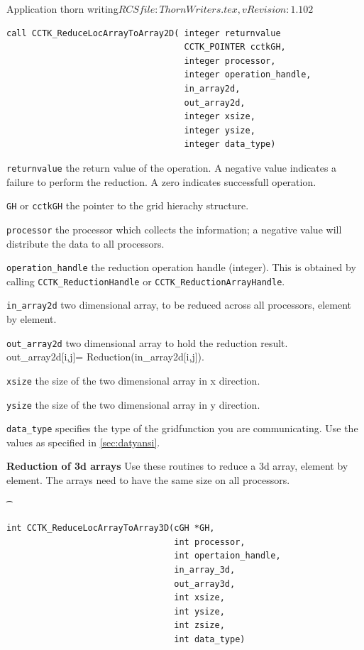 \begin{cactuspart}{2}{Application thorn writing}{$RCSfile: ThornWriters.tex,v $}{$Revision: 1.102 $}
{\begin{verbatim}
call CCTK_ReduceLocArrayToArray2D( integer returnvalue
                                   CCTK_POINTER cctkGH,
                                   integer processor,
                                   integer operation_handle,
                                   in_array2d,
                                   out_array2d,
                                   integer xsize,
                                   integer ysize,
                                   integer data_type)
\end{verbatim}
}

\begin{Lentry}
\item[{\tt returnvalue}] the return value of the operation.  A
negative value indicates a failure to perform the reduction.  A zero
indicates successfull operation.
\item[{\tt GH} or {\tt cctkGH}] the pointer to the grid hierachy
structure.
\item[{\tt processor}] the processor which collects the
information; a negative value will distribute the data to all
processors.
\item[{\tt operation\_handle}] the reduction operation handle
(integer).  This is obtained by calling {\tt CCTK\_ReductionHandle} or
{\tt CCTK\_ReductionArrayHandle}.

\item[{\tt in\_array2d}] two dimensional array, to be reduced across all
processors, element by element.
\item[{\tt out\_array2d}] two dimensional array to hold the reduction
result. out\_array2d[i,j]= Reduction(in\_array2d[i,j]).
\item[{\tt xsize}] the size of the two dimensional array in x direction.
\item[{\tt ysize}] the size of the two dimensional array in y
direction.

\item[{\tt data\_type}] specifies the type of the gridfunction you are
communicating. Use the values as specified in \ref{sec:datyansi}.
\end{Lentry}

\vskip 0.24cm
{\bf Reduction of 3d arrays} Use these routines to reduce a 3d array, element by element. The arrays need to have the same size on all
processors.
{\t
\begin{verbatim}
int CCTK_ReduceLocArrayToArray3D(cGH *GH,
                                 int processor,
                                 int opertaion_handle,
                                 in_array_3d,
                                 out_array3d,
                                 int xsize,
                                 int ysize,
                                 int zsize,
                                 int data_type)


\end{verbatim}}
\end{cactuspart}
